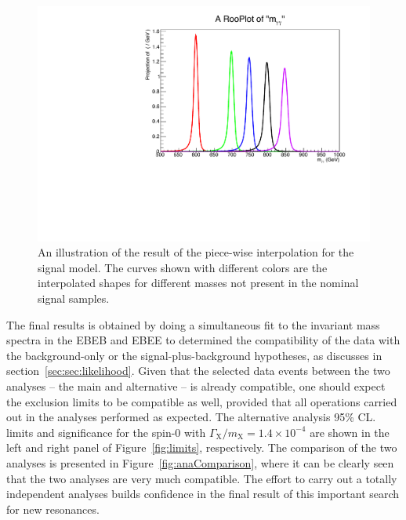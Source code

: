 \begin{figure}[htb]
    \centering
    \includegraphics[width=\cmsFigWidth]{HighMassDiphoton/DoubleCBInterpolated.pdf}
     \caption{An illustration of the result of the piece-wise
       interpolation for the signal model. The curves shown with
       different colors are the interpolated shapes for different
       masses not present in the nominal signal samples.
      \label{fig:interpol}
    }
\end{figure}

The final results is obtained by doing a simultaneous fit to the
invariant mass spectra in the EBEB and EBEE to determined the
compatibility of the data with the background-only or the
signal-plus-background hypotheses, as discusses in
section~\ref{sec:sec:likelihood}. Given that the selected data events between
the two analyses -- the main and alternative -- is already compatible,
one should expect the exclusion limits to be compatible as well,
provided that all operations carried out in the analyses performed as
expected. The alternative analysis  95\% CL. limits and significance for the spin-0 with  $\Gamma_{\mathrm{X}}/m_{\mathrm{X}} =
1.4\times10^{-4}$ are shown in the left and right panel of
Figure~\ref{fig:limits}, respectively. The comparison of the two
analyses is presented in Figure~\ref{fig:anaComparison}, where it can
be clearly seen that the two analyses are very much compatible. The
effort to carry out a totally independent analyses builds confidence
in the final result of this important search for new resonances.

